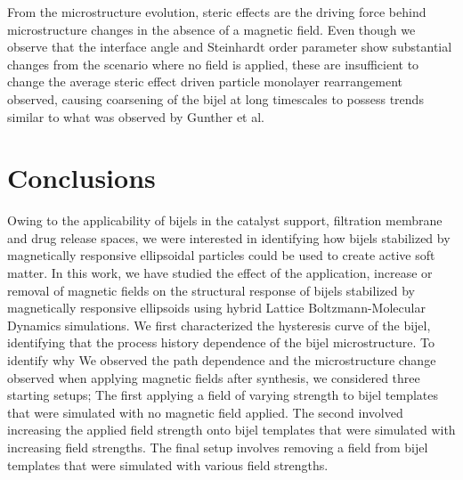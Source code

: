 From the microstructure evolution, steric effects are the
driving force behind microstructure changes in the absence of a magnetic
field. Even though we observe that the interface angle and Steinhardt
order parameter show substantial changes from the scenario where no
field is applied, these are insufficient to change the average steric
effect driven particle monolayer rearrangement observed, causing
coarsening of the bijel at long timescales to possess trends similar to what was observed by
Gunther et al. \cite{gunther_timescales_2014}

\section{Conclusions}

Owing to the applicability of bijels in the catalyst support, filtration membrane and drug release spaces, we were interested in identifying how bijels stabilized 
by magnetically responsive ellipsoidal particles could be used to create active soft matter. In this work, we have studied the effect of the application, increase 
or removal of magnetic fields on the structural response of bijels stabilized by magnetically responsive ellipsoids using hybrid Lattice Boltzmann-Molecular Dynamics 
simulations. We first characterized the hysteresis curve of the bijel, identifying that the process history dependence of the bijel microstructure. To identify why 
We observed the path dependence and the microstructure change observed when applying magnetic fields after synthesis, we considered three starting setups; The first 
applying a field of varying strength to bijel templates that were simulated with no magnetic field applied. The second involved increasing the applied field 
strength onto bijel templates that were simulated with increasing field strengths. The final setup involves removing a field from bijel templates that were simulated 
with various field strengths. 

